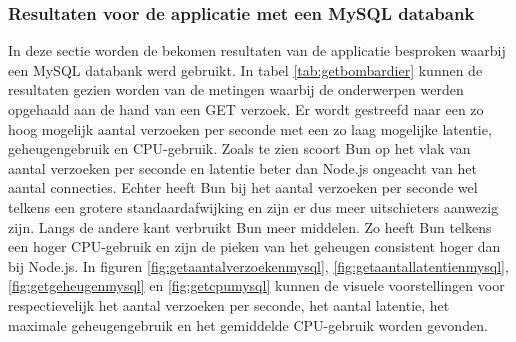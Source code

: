 \subsubsection{Resultaten voor de applicatie met een MySQL databank}
In deze sectie worden de bekomen resultaten van de applicatie besproken waarbij een MySQL databank werd gebruikt.
In tabel \ref{tab:getbombardier} kunnen de resultaten gezien worden van de metingen waarbij de onderwerpen werden opgehaald aan de hand van een GET verzoek.
Er wordt gestreefd naar een zo hoog mogelijk aantal verzoeken per seconde met een zo laag mogelijke latentie, geheugengebruik en CPU-gebruik.
Zoals te zien scoort Bun op het vlak van aantal verzoeken per seconde en latentie beter dan Node.js ongeacht van het aantal connecties. 
Echter heeft Bun bij het aantal verzoeken per seconde wel telkens een grotere standaardafwijking en zijn er dus meer uitschieters aanwezig zijn.
Langs de andere kant verbruikt Bun meer middelen. Zo heeft Bun telkens een hoger CPU-gebruik en zijn de pieken van het geheugen consistent hoger dan bij Node.js.
In figuren \ref{fig:getaantalverzoekenmysql}, \ref{fig:getaantallatentienmysql}, \ref{fig:getgeheugenmysql} en \ref{fig:getcpumysql} kunnen de visuele voorstellingen 
voor respectievelijk het aantal verzoeken per seconde, het aantal latentie, het maximale geheugengebruik en het gemiddelde CPU-gebruik worden gevonden.
